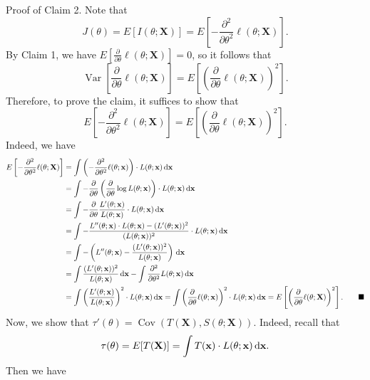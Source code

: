 \documentclass[10pt]{article}
\makeatletter
\newcommand{\dd}{\,{\rm d}}
\DeclareMathOperator{\Var}{Var}
\DeclareMathOperator{\Cov}{Cov}
\theoremstyle{newstyle}
\newenvironment{pf}[1][\proofname]{\par
  \pushQED{\qed}%
  \normalfont \topsep0\p@\relax
  \trivlist
  \item[\hskip\labelsep\scshape
  #1\@addpunct{.}]\ignorespaces
}{%
  \popQED\endtrivlist\@endpefalse
}
\makeatother
\begin{document}
\begin{pf}
{\sc Proof of Claim 2.} Note that 
\[ J(\theta) = E[I(\theta; \mathbf X)] = E\left[ -\frac{\partial^2}{\partial \theta^2} \ell(\theta;
\mathbf X) \right]. \]
By Claim 1, we have $E[\frac{\partial}{\partial\theta} \ell(\theta; \mathbf X)] = 0$, so it follows that 
\[ \Var\left[ \frac{\partial}{\partial\theta} \ell(\theta; \mathbf X) \right] = 
E \left[ \left( \frac{\partial}{\partial\theta} \ell(\theta; \mathbf X) \right)^2 \right]. \]
Therefore, to prove the claim, it suffices to show that 
\[ E\left[ -\frac{\partial^2}{\partial \theta^2} \ell(\theta;
\mathbf X) \right] = E \left[ \left( \frac{\partial}{\partial\theta} \ell(\theta; \mathbf X) \right)^2 \right]. \]
Indeed, we have 
\begin{align*}
    E\left[ -\frac{\partial^2}{\partial \theta^2} \ell(\theta;
\mathbf X) \right] 
&= \int \left( -\frac{\partial^2}{\partial\theta^2} \ell(\theta; \mathbf x) \right) \cdot L(\theta; 
\mathbf x)\dd\mathbf x \\
&= \int -\frac{\partial}{\partial\theta} \left( \frac{\partial}{\partial\theta} \log L(\theta;
\mathbf x) \right) \cdot L(\theta; \mathbf x) \dd\mathbf x \\
&= \int - \frac{\partial}{\partial\theta} \frac{L'(\theta; \mathbf x)}{L(\theta; \mathbf x)} 
\cdot L(\theta; \mathbf x) \dd\mathbf x \\
&= \int - \frac{L''(\theta; \mathbf x) \cdot L(\theta; \mathbf x) - (L'(\theta; \mathbf x))^2}{(L(\theta; \mathbf x))^2} \cdot L(\theta; \mathbf x)\dd\mathbf x \\
&= \int - \left( L''(\theta; \mathbf x) - \frac{(L'(\theta; \mathbf x))^2}{L(\theta; \mathbf x)} \right)\dd\mathbf x \\
&= \int \frac{(L'(\theta; \mathbf x))^2}{L(\theta; \mathbf x)} \dd\mathbf x - \int 
\frac{\partial^2}{\partial\theta^2} L(\theta; \mathbf x)\dd \mathbf x \\
&= \int \left( \frac{L'(\theta; \mathbf x)}{L(\theta; \mathbf x)} \right)^2 \cdot L(\theta; 
\mathbf x) \dd\mathbf x 
= \int \left( \frac{\partial}{\partial\theta} \ell(\theta; \mathbf x) \right)^2 \cdot L(\theta; 
\mathbf x) \dd \mathbf x = E \left[ \left( \frac{\partial}{\partial\theta} \ell(\theta; \mathbf X) 
\right)^2 \right]. \tag*{$\blacksquare$}
\end{align*}
Now, we show that $\tau'(\theta) = \Cov(T(\mathbf X), S(\theta; \mathbf X))$. Indeed, recall that 
\[ \tau(\theta) = E[T(\mathbf X)] = \int T(\mathbf x) \cdot L(\theta; \mathbf x)\dd\mathbf x. \]
Then we have 
\begin{align*}

\end{align*}
\end{pf}
\end{document}
